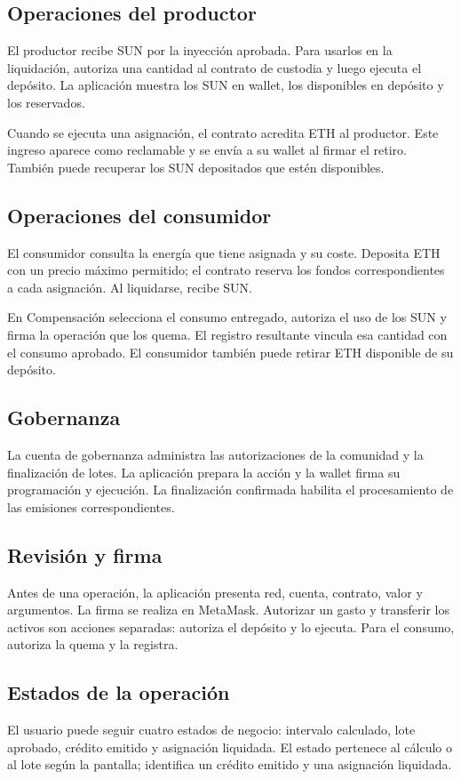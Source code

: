 \subsection{Operaciones del productor}
El productor recibe SUN por la inyección aprobada. Para usarlos en la liquidación, autoriza una cantidad al contrato de custodia y luego ejecuta el depósito. La aplicación muestra los SUN en wallet, los disponibles en depósito y los reservados.

Cuando se ejecuta una asignación, el contrato acredita ETH al productor. Este ingreso aparece como reclamable y se envía a su wallet al firmar el retiro. También puede recuperar los SUN depositados que estén disponibles.

\subsection{Operaciones del consumidor}
El consumidor consulta la energía que tiene asignada y su coste. Deposita ETH con un precio máximo permitido; el contrato reserva los fondos correspondientes a cada asignación. Al liquidarse, recibe SUN.

En Compensación selecciona el consumo entregado, autoriza el uso de los SUN y firma la operación que los quema. El registro resultante vincula esa cantidad con el consumo aprobado. El consumidor también puede retirar ETH disponible de su depósito.

\subsection{Gobernanza}
La cuenta de gobernanza administra las autorizaciones de la comunidad y la finalización de lotes. La aplicación prepara la acción y la wallet firma su programación y ejecución. La finalización confirmada habilita el procesamiento de las emisiones correspondientes.

\subsection{Revisión y firma}
Antes de una operación, la aplicación presenta red, cuenta, contrato, valor y argumentos. La firma se realiza en MetaMask. Autorizar un gasto y transferir los activos son acciones separadas:  autoriza el depósito y  lo ejecuta. Para el consumo,  autoriza la quema y  la registra.

\subsection{Estados de la operación}
El usuario puede seguir cuatro estados de negocio: intervalo calculado, lote aprobado, crédito emitido y asignación liquidada. El estado  pertenece al cálculo o al lote según la pantalla;  identifica un crédito emitido y  una asignación liquidada.

